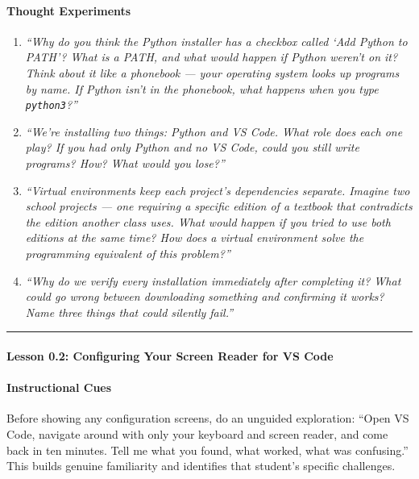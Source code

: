 \documentclass[
  justified,
  openright,
]{tufte-book}
\let\subsection\paragraph
\let\paragraph\paragraph
\let\subsection\paragraph
\let\paragraph\paragraph
\begin{document}
\paragraph{Thought Experiments}\label{thought-experiments}

\begin{enumerate}
\def\labelenumi{\arabic{enumi}.}
\item
  \emph{``Why do you think the Python installer has a checkbox called
  `Add Python to PATH'? What is a PATH, and what would happen if Python
  weren't on it? Think about it like a phonebook --- your operating
  system looks up programs by name. If Python isn't in the phonebook,
  what happens when you type \texttt{python3}?''}
\item
  \emph{``We're installing two things: Python and VS Code. What role
  does each one play? If you had only Python and no VS Code, could you
  still write programs? How? What would you lose?''}
\item
  \emph{``Virtual environments keep each project's dependencies
  separate. Imagine two school projects --- one requiring a specific
  edition of a textbook that contradicts the edition another class uses.
  What would happen if you tried to use both editions at the same time?
  How does a virtual environment solve the programming equivalent of
  this problem?''}
\item
  \emph{``Why do we verify every installation immediately after
  completing it? What could go wrong between downloading something and
  confirming it works? Name three things that could silently fail.''}
\end{enumerate}

\begin{center}\rule{0.5\linewidth}{0.5pt}\end{center}

\subsection{Lesson 0.2: Configuring Your Screen Reader for VS
Code}\label{lesson-0.2-configuring-your-screen-reader-for-vs-code}

\paragraph{Instructional Cues}\label{instructional-cues-1}

Before showing any configuration screens, do an unguided exploration:
``Open VS Code, navigate around with only your keyboard and screen
reader, and come back in ten minutes. Tell me what you found, what
worked, what was confusing.'' This builds genuine familiarity and
identifies that student's specific challenges.
\end{document}
